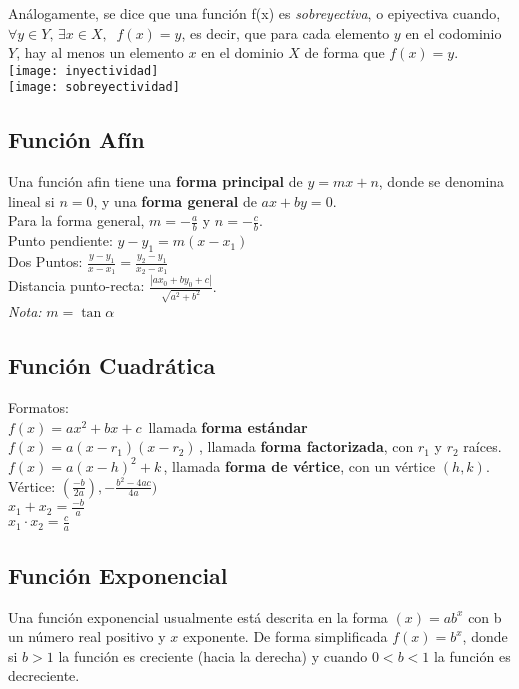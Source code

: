 Análogamente, se dice que una función f(x) es \textit{sobreyectiva}, o epiyectiva cuando, $\forall y \in Y, \, \exists x \in X, \;\; f(x)=y$, es decir, que para cada elemento $y$ en el codominio $Y$, hay al menos un elemento $x$ en el dominio $X$ de forma que $f(x) = y$.\\
\texttt{[image: inyectividad]}\\
\texttt{[image: sobreyectividad]}
\subsection{Función Afín}
Una función afin tiene una \textbf{forma principal} de $y = mx + n$, donde se denomina lineal si $n=0$, y una \textbf{forma general} de $ax + by = 0$.\\
Para la forma general, $m = -\frac{a}{b}$ y $n = -\frac{c}{b}.$\\
Punto pendiente: $y - y_1 = m(x - x_1)$\\
Dos Puntos: $\frac{y-y_1}{x-x_1} = \frac{y_2-y_1}{x_2-x_1}$\\
Distancia punto-recta: $\frac{|ax_0+by_0+c|}{\sqrt{a^2+b^2}}.$\\
\textit{Nota:} $m = \tan \alpha$

\subsection{Función Cuadrática}
Formatos:\\
$f(x) = a x^2 + b x + c \,\!$ llamada \textbf{forma estándar}\\
$f(x) = a(x - r_1)(x - r_2)\,\!$, llamada \textbf{forma factorizada}, con $r_1$ y $r_2$ raíces.\\
$f(x) = a(x - h)^2 + k \,\!$, llamada \textbf{forma de vértice}, con un vértice $(h, k)$.\\

Vértice: $(\frac{-b}{2a}),-\frac{b^2-4ac}{4a})$\\
$x_1 + x_2 = \frac{-b}{a}$\\
$x_1 \cdot x_2 = \frac{c}{a}$\\

\subsection{Función Exponencial}
Una función exponencial usualmente está descrita en la forma $(x) = ab^x$ con b un número real positivo y $x$ exponente. De forma simplificada $f(x) = b^x$, donde si $b > 1$ la función es creciente (hacia la derecha) y cuando $0 < b < 1$ la función es decreciente.\\

